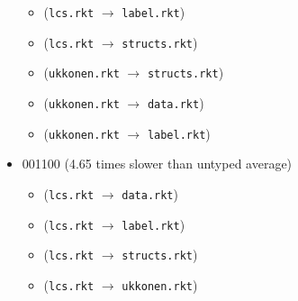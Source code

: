 \documentclass{article}
\newcommand{\mono}[1]{\texttt{#1}}
\begin{document}
\begin{itemize}
\begin{itemize}
  \item (\mono{lcs.rkt} $\rightarrow$ \mono{label.rkt})
  \item (\mono{lcs.rkt} $\rightarrow$ \mono{structs.rkt})
  \item (\mono{ukkonen.rkt} $\rightarrow$ \mono{structs.rkt})
  \item (\mono{ukkonen.rkt} $\rightarrow$ \mono{data.rkt})
  \item (\mono{ukkonen.rkt} $\rightarrow$ \mono{label.rkt})
  \end{itemize}
\item 001100 (4.65 times slower than untyped average)
  \begin{itemize}
  \item (\mono{lcs.rkt} $\rightarrow$ \mono{data.rkt})
  \item (\mono{lcs.rkt} $\rightarrow$ \mono{label.rkt})
  \item (\mono{lcs.rkt} $\rightarrow$ \mono{structs.rkt})
  \item (\mono{lcs.rkt} $\rightarrow$ \mono{ukkonen.rkt})
  \end{itemize}


\end{itemize}
\end{document}
